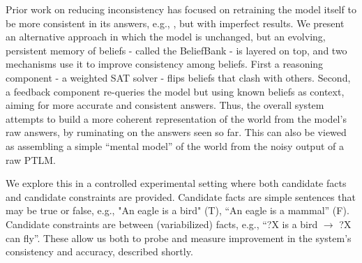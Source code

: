 \documentclass[11pt]{article}
\newcommand{\eat}[1]{}
\newcommand{\red}[1]{\textcolor{red}{#1}}
\begin{document}
Prior work on reducing inconsistency has focused on retraining the model itself to be
more consistent in its answers, e.g., \cite{Ribeiro2019AreRR,Li2019ALF}, but with imperfect results. We present an
alternative approach in which the model is unchanged, but an evolving, persistent memory
of beliefs - called the BeliefBank - is layered on top, and two mechanisms use it 
to improve consistency among beliefs. First a reasoning component - a weighted SAT solver -
flips beliefs that clash with others. Second, a feedback component re-queries the model
but using known beliefs as context, aiming for more accurate and consistent answers. 
Thus, the overall system attempts to build a more coherent representation of the
world from the model's raw answers, by ruminating on the answers seen so far.
This can also be viewed as assembling a simple ``mental model'' of the world \cite{JohnsonLaird1983MentalM} from
the noisy output of a raw PTLM.

\eat{
In addition, 
just as the model helps populate the BeliefBank, we also show how beliefs in
the BeliefBank can improve the model's answers to future questions,
by using the most relevant beliefs as additional context for question-answering
(i.e., reminding the model of important facts pertinent to the new question).
These improved answers then feed into the growing BeliefBank, allowing the
overall system (model + BeliefBank) to continuously improve performance over
time, without retraining the model itself.
}

We explore this in a controlled experimental setting where 
both candidate facts and candidate constraints are provided. Candidate facts are simple
sentences that may be true or false, e.g., "An eagle is a bird" (T), ``An eagle is a mammal'' (F). Candidate constraints are between (variabilized) facts, e.g., ``?X is a bird $\rightarrow$ ?X can fly''. These allow us both to probe and measure improvement
in the system's consistency and accuracy, described shortly.

\eat{
\red{Delete/reword this paragraph} Our approach involves an interplay between a model's raw answers, and an
evolving memory - the BeliefBank - of beliefs based on the model's earlier answers
and a set of constraints that should hold. Model's answers contribute to the BeliefBank,
and the BeliefBank contribute new context to help with future question-answering by
the model. In between, a constraint system serves to identify and reduce inconsistency
among beliefs in the BeliefBank. Combined, this results in a system capable of
continuous improvement over time, opening new possibilities for dialog and
interactive teaching.
}
\end{document}
